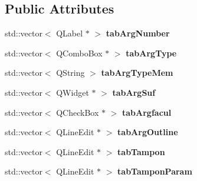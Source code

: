 \subsection*{Public Attributes}
\begin{DoxyCompactItemize}
\item 
\hypertarget{classConnectionSettings_a255f866adcca66025ae71d8fff01f708}{std\+::vector$<$ Q\+Label $\ast$ $>$ {\bfseries tab\+Arg\+Number}}\label{classConnectionSettings_a255f866adcca66025ae71d8fff01f708}

\item 
\hypertarget{classConnectionSettings_acabf7a26c24257ceb58a20e2faedc1d7}{std\+::vector$<$ Q\+Combo\+Box $\ast$ $>$ {\bfseries tab\+Arg\+Type}}\label{classConnectionSettings_acabf7a26c24257ceb58a20e2faedc1d7}

\item 
\hypertarget{classConnectionSettings_aaa24d0415cbe3cea62e9e223b85e4b1e}{std\+::vector$<$ Q\+String $>$ {\bfseries tab\+Arg\+Type\+Mem}}\label{classConnectionSettings_aaa24d0415cbe3cea62e9e223b85e4b1e}

\item 
\hypertarget{classConnectionSettings_a4d1c136cb1b682352e729be9df56f476}{std\+::vector$<$ Q\+Widget $\ast$ $>$ {\bfseries tab\+Arg\+Suf}}\label{classConnectionSettings_a4d1c136cb1b682352e729be9df56f476}

\item 
\hypertarget{classConnectionSettings_afc80dd0a61bb1a80ded2abda3d11a634}{std\+::vector$<$ Q\+Check\+Box $\ast$ $>$ {\bfseries tab\+Argfacul}}\label{classConnectionSettings_afc80dd0a61bb1a80ded2abda3d11a634}

\item 
\hypertarget{classConnectionSettings_a782c02d6ba749aaf1b30fb44135bcc69}{std\+::vector$<$ Q\+Line\+Edit $\ast$ $>$ {\bfseries tab\+Arg\+Outline}}\label{classConnectionSettings_a782c02d6ba749aaf1b30fb44135bcc69}

\item 
\hypertarget{classConnectionSettings_a7aecc71eb4a2560579e204591a22a56f}{std\+::vector$<$ Q\+Line\+Edit $\ast$ $>$ {\bfseries tab\+Tampon}}\label{classConnectionSettings_a7aecc71eb4a2560579e204591a22a56f}

\item 
\hypertarget{classConnectionSettings_a60c6c6b6d298134bf26ad06e0fb6377c}{std\+::vector$<$ Q\+Line\+Edit $\ast$ $>$ {\bfseries tab\+Tampon\+Param}}\label{classConnectionSettings_a60c6c6b6d298134bf26ad06e0fb6377c}


\end{DoxyCompactItemize}
